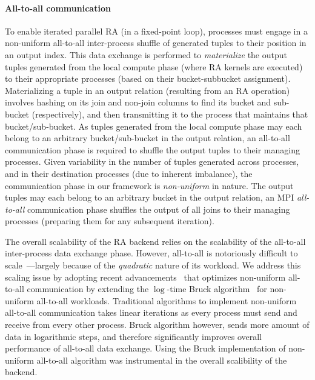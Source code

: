 \paragraph*{All-to-all communication}
To enable iterated parallel RA (in a fixed-point loop), processes must engage in a non-uniform all-to-all inter-process shuffle of generated tuples to their position in an output index.
This data exchange is performed to \emph{materialize} the output tuples generated from the local compute phase (where RA kernels are executed) to their appropriate processes (based on their bucket-subbucket assignment).
Materializing a tuple in an output relation (resulting from an RA operation) involves hashing on its join and non-join columns to find its bucket and sub-bucket (respectively), and then transmitting it to the process that maintains that bucket/sub-bucket.
As tuples generated from the local compute phase may each belong to an arbitrary bucket/sub-bucket in the output relation, an all-to-all communication phase is required to shuffle the output tuples to their managing processes.
Given variability in the number of tuples generated across processes, and in their destination processes (due to inherent imbalance), the communication phase in our framework is \emph{non-uniform} in nature.
The output tuples may each belong to an arbitrary bucket in the output relation, an MPI \emph{all-to-all} communication phase shuffles the output of all joins to their managing processes (preparing them for any subsequent iteration).

The overall scalability of the RA backend relies on the scalability of the all-to-all inter-process data exchange phase.
However, all-to-all is notoriously difficult to scale~\cite{4536141, scott1991efficient, thakur2005optimization}---largely because of the \emph{quadratic} nature of its workload. 
We address this scaling issue by adopting recent advancements~\cite{fan2022optimizing} that optimizes non-uniform all-to-all communication by extending the $\log$-time Bruck algorithm~\cite{bruck1997efficient, thakur2005optimization, traff2014implementing} for non-uniform all-to-all workloads. Traditional algorithms to implement non-uniform all-to-all communication takes linear iterations as every process must send and receive from every other process. Bruck algorithm however, sends more amount of data in logarithmic steps, and therefore significantly improves overall performance of all-to-all data exchange. Using the Bruck implementation of non-uniform all-to-all algorithm was instrumental in the overall scalibility of the backend.

